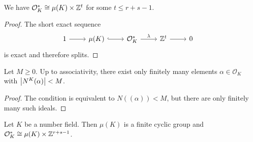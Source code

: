 \begin{trditev}
We have $\mathcal{O}_K^* \cong \mu(K) \times \mathbb{Z}^t$ for some
$t \leq r+s-1$.
\end{trditev}

\begin{proof}
The short exact sequence
\[
\begin{tikzcd}
1 \arrow[r] &
\mu(K) \arrow[r, hook] &
\mathcal{O}_K^* \arrow[r, "\lambda"] &
\Z^t \arrow[r] &
0
\end{tikzcd}
\]
is exact and therefore splits.
\end{proof}

\begin{lema}
Let $M \geq 0$. Up to associativity, there exist only finitely many
elements $\alpha \in \mathcal{O}_K$ with $\left\lvert N^K(\alpha)\right\rvert < M$.
\end{lema}

\begin{proof}
The condition is equivalent to $N((\alpha)) < M$, but there are
only finitely many such ideals.
\end{proof}

\begin{izrek}
Let $K$ be a number field. Then $\mu(K)$ is a finite cyclic group
and $\mathcal{O}_K^* \cong \mu(K) \times \mathbb{Z}^{r+s-1}$.
\end{izrek}

